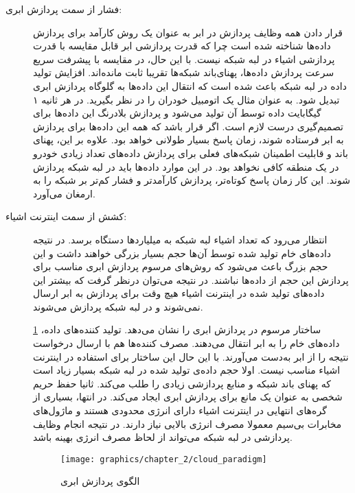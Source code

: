       \begin{description}
        \item [فشار از سمت پردازش ابری:]
          قرار دادن همه وظایف پردازش در ابر به عنوان یک روش کارآمد برای پردازش داده‌ها شناخته شده است چرا که قدرت پردازشی ابر قابل مقایسه با قدرت پردازشی اشیاء در لبه شبکه نیست.
          با این حال، در مقایسه با پیشرفت سریع سرعت پردازش داده‌ها، پهنای‌باند شبکه‌ها تقریبا ثابت مانده‌اند.
          افزایش تولید داده در لبه شبکه باعث شده است که انتقال این داده‌ها به گلوگاه پردازش ابری تبدیل شود.
          به عنوان مثال یک اتومبیل خودران را در نظر بگیرید.
          در هر ثانیه ۱ گیگابایت داده توسط آن تولید می‌شود و پردازش بلادرنگ این داده‌ها برای تصمیم‌گیری درست لازم است.
          اگر قرار باشد که همه این داده‌ها برای پردازش به ابر فرستاده شوند، زمان پاسخ بسیار طولانی خواهد بود.
          علاوه بر این، پهنای باند و قابلیت اطمینان شبکه‌های فعلی برای پردازش داده‌‌های تعداد زیادی خودرو در یک منطقه کافی نخواهد بود.
          در این موارد داده‌ها باید در لبه شبکه پردازش شوند.
          این کار زمان پاسخ کوتاه‌تر، پردازش کارآمد‌تر و فشار کم‌تر بر شبکه را به ارمغان می‌آورد.

        \item [کشش از سمت اینترنت اشیاء:]
          انتظار می‌رود که تعداد اشیاء لبه شبکه به میلیارد‌ها دستگاه برسد.
          در نتیجه داده‌های خام تولید شده توسط آن‌ها حجم بسیار بزرگی خواهند داشت و این حجم بزرگ باعث می‌شود که روش‌های مرسوم پردازش ابری مناسب برای پردازش این حجم از داده‌ها نباشند.
          در نتیجه می‌توان درنظر گرفت که بیشتر این داده‌های تولید شده در اینترنت اشیاء هیچ وقت برای پردازش به ابر ارسال نمی‌شوند و در لبه شبکه پردازش می‌شوند.

          \cref{fig:chapter_2:cloud_paradigm} ساختار مرسوم در پردازش ابری را نشان می‌دهد.
          تولید کننده‌های داده، داده‌های خام را به ابر انتقال می‌دهند.
          مصرف کننده‌ها هم با ارسال درخواست نتیجه را از ابر به‌دست می‌آورند.
          با این حال این ساختار برای استفاده در اینترنت اشیاء مناسب نیست.
          اولا حجم داده‌ی تولید شده در لبه شبکه بسیار زیاد است که پهنای باند شبکه و منابع پردازشی زیادی را طلب می‌کند.
          ثانیا حفظ حریم شخصی به عنوان یک مانع برای پردازش ابری ایجاد می‌کند.
          در انتها، بسیاری از گره‌های انتهایی در اینترنت اشیاء دارای انرژی محدودی هستند و ماژول‌های مخابرات بی‌سیم معمولا مصرف انرژی بالایی نیاز دارند.
          در نتیجه انجام وظایف پردازشی در لبه شبکه می‌تواند از لحاظ مصرف انرژی بهینه‌ باشد.

          \begin{figure}[h]
            \centerline{\texttt{[image: graphics/chapter\_2/cloud\_paradigm]}}
            \caption{الگوی پردازش ابری \cite{shi2016edge}}
            \label{fig:chapter_2:cloud_paradigm}
          \end{figure}


\end{description}
